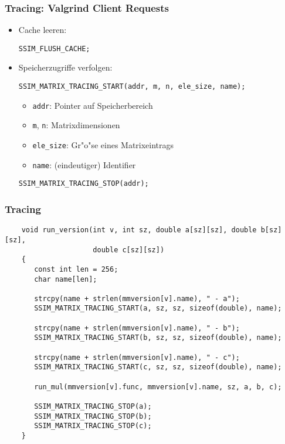 \begin{frame} [fragile] \frametitle{Tracing: Valgrind Client Requests}
	\begin{itemize}
	
	\item Cache leeren:
	\begin{lstlisting}[numbers=none]
	SSIM_FLUSH_CACHE;
	\end{lstlisting}
	
	\item<2-> Speicherzugriffe verfolgen:
	\begin{lstlisting}[numbers=none]
	SSIM_MATRIX_TRACING_START(addr, m, n, ele_size, name);
	\end{lstlisting}
	\begin{itemize}
		\item \verb|addr|: Pointer auf Speicherbereich
		\item \verb|m|, \verb|n|: Matrixdimensionen
		\item \verb|ele_size|: Gr"o"se eines Matrixeintrags
		\item \verb|name|: (eindeutiger) Identifier
	\end{itemize}
	
	\begin{lstlisting}[numbers=none]
	SSIM_MATRIX_TRACING_STOP(addr);
	\end{lstlisting}
	
	\end{itemize}
\end{frame}

\begin{frame} [fragile] \frametitle{Tracing}
	\begin{lstlisting}
	void run_version(int v, int sz, double a[sz][sz], double b[sz][sz], 
	                 double c[sz][sz])
	{
	   const int len = 256;
	   char name[len];
	   
	   strcpy(name + strlen(mmversion[v].name), " - a");
	   SSIM_MATRIX_TRACING_START(a, sz, sz, sizeof(double), name);

	   strcpy(name + strlen(mmversion[v].name), " - b");
	   SSIM_MATRIX_TRACING_START(b, sz, sz, sizeof(double), name);

	   strcpy(name + strlen(mmversion[v].name), " - c");
	   SSIM_MATRIX_TRACING_START(c, sz, sz, sizeof(double), name);

	   run_mul(mmversion[v].func, mmversion[v].name, sz, a, b, c);

	   SSIM_MATRIX_TRACING_STOP(a);
	   SSIM_MATRIX_TRACING_STOP(b);
	   SSIM_MATRIX_TRACING_STOP(c);
	}
	\end{lstlisting}
\end{frame}

